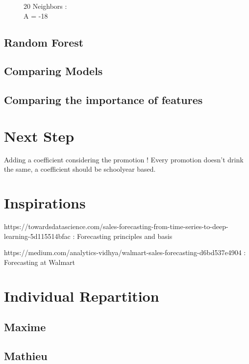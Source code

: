 \documentclass{report}
\begin{document}
\begin{figure}[!htb]
  \caption{20 Neighbors : \\A = -18}\label{fig:KNN20Nei}
\endminipage
\end{figure}




\section{Random Forest}

\section{Comparing Models}



\section{Comparing the importance of features}


\chapter{Next Step}

Adding a coefficient considering the promotion ! Every promotion doesn't drink the same, a coefficient should be schoolyear based.

\chapter{Inspirations}

https://towardsdatascience.com/sales-forecasting-from-time-series-to-deep-learning-5d115514bfac : Forecasting principles and basis 

https://medium.com/analytics-vidhya/walmart-sales-forecasting-d6bd537e4904 : Forecasting at Walmart 


\chapter{Individual Repartition}

\section{Maxime}

\section{Mathieu}
\end{document}
